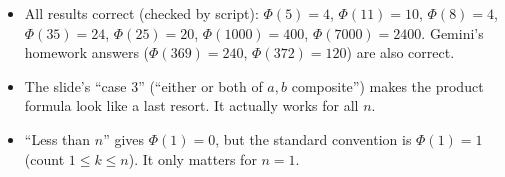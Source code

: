 \begin{fixbox}
\begin{itemize}
  \item All results correct (checked by script): $\Phi(5) = 4$, $\Phi(11) = 10$, $\Phi(8) = 4$, $\Phi(35) = 24$, $\Phi(25) = 20$, $\Phi(1000) = 400$, $\Phi(7000) = 2400$. Gemini's homework answers ($\Phi(369) = 240$, $\Phi(372) = 120$) are also correct.
  \item The slide's ``case 3'' (``either or both of $a, b$ composite'') makes the product formula look like a last resort. It actually works for all $n$.
  \item ``Less than $n$'' gives $\Phi(1) = 0$, but the standard convention is $\Phi(1) = 1$ (count $1 \le k \le n$). It only matters for $n = 1$.
\end{itemize}
\end{fixbox}
